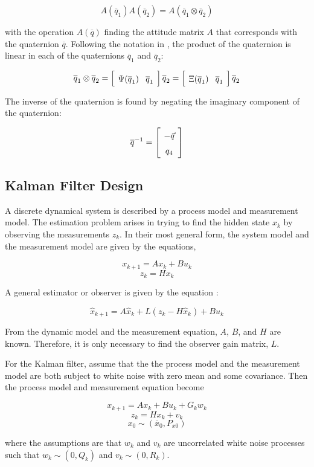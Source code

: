 \documentclass{article}
\newcommand{\mat}[2][ccccccccccccccccccccccccccccccccccccccccccccc]{\left[
        \arraycolsep=4pt\def\arraystretch{1.5}
        \begin{array}{#1} #2 \\ 
        \end{array} 
        \right]}
\begin{document}
\begin{flushleft}
\[ A(\overline{q}_1) A(\overline{q}_2) = A(\overline{q}_1 \otimes \overline{q}_2) \]

with the operation $A(\overline{q})$ finding the attitude matrix $A$ that corresponds with the quaternion $\overline{q}$. Following the notation in \cite{Markley2007}, the product of the quaternion is linear in each of the quaternions $\overline{q}_1$ and $\overline{q}_2$: 

\[ \overline{q}_1 \otimes \overline{q}_2 = \mat{ \Psi({\overline{q}_1}) & \overline{q}_1} \overline{q}_2 = \mat{ \Xi({\overline{q}_1}) & \overline{q}_1 } \overline{q}_2 \]

The inverse of the quaternion is found by negating the imaginary component of the quaternion: 

\[ \overline{q}^{-1} = \mat{ -\vec{q} \\ q_4 } \]

\subsection{Kalman Filter Design} 

A discrete dynamical system is described by a process model and measurement model. The estimation problem arises in trying to find the hidden state $x_k$ by observing the measurements $z_k$. In their most general form, the system model and the measurement model are given by the equations, 

\[ x_{k+1} = A x_k + B u_k \]
\[ z_k = H x_k \]

A general estimator or observer is given by the equation \cite{Lewis2007}: 

\[ \hat{x}_{k+1} = A \hat{x}_k + L (z_k - H \hat{x}_k) + B u_k \]

From the dynamic model and the measurement equation, $A$, $B$, and $H$ are known. Therefore, it is only necessary to find the observer gain matrix, $L$. 

\medskip

For the Kalman filter, assume that the the process model and the measurement model are both subject to white noise with zero mean and some covariance. Then the process model and measurement equation become 

\[ x_{k+1} = A x_k + B u_k + G_k w_k \]
\[ z_k = H x_k + v_k \]
\[ x_0 \sim (\overline{x}_0, P_{x0}) \]

where the assumptions are that {$w_k$} and {$v_k$} are uncorrelated white noise processes such that $w_k \sim (0, Q_k)$ and $v_k \sim (0,R_k)$. 


\end{flushleft}
\end{document}
